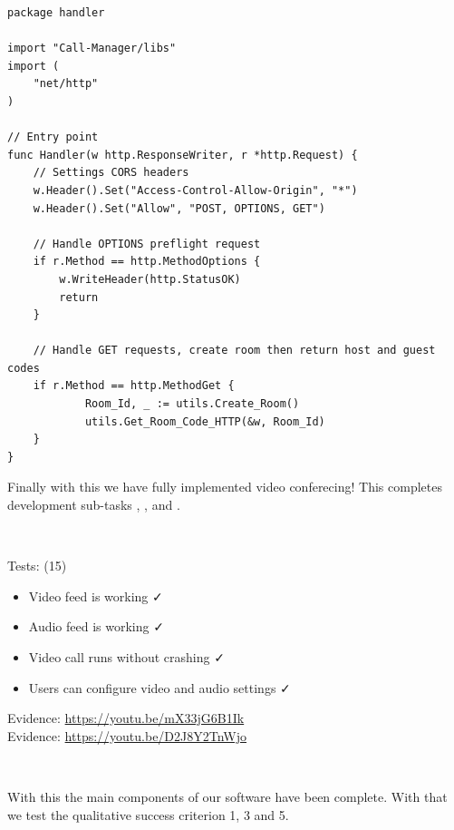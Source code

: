 \begin{verbatim}
package handler

import "Call-Manager/libs"
import (
	"net/http"
)

// Entry point
func Handler(w http.ResponseWriter, r *http.Request) {
	// Settings CORS headers
	w.Header().Set("Access-Control-Allow-Origin", "*")
	w.Header().Set("Allow", "POST, OPTIONS, GET")

	// Handle OPTIONS preflight request
	if r.Method == http.MethodOptions {
		w.WriteHeader(http.StatusOK)
		return
	}

	// Handle GET requests, create room then return host and guest codes
	if r.Method == http.MethodGet {
    		Room_Id, _ := utils.Create_Room()
     		utils.Get_Room_Code_HTTP(&w, Room_Id)
	}
}
\end{verbatim}

Finally with this we have fully implemented video conferecing!
This completes development sub-tasks , ,  and
.

{\color{gray} \hrulefill} \\ \vspace{0.2cm}

{\sffamily Tests: (15)}

\begin{itemize}
  \item Video feed is working \faCheck \\
  \item Audio feed is working \faCheck \\
  \item Video call runs without crashing \faCheck \\
  \item Users can configure video and audio settings \faCheck \\
\end{itemize}

{\sffamily Evidence: } \url{https://youtu.be/mX33jG6B1Ik} \\ \vspace{0.2cm}
{\sffamily Evidence: } \url{https://youtu.be/D2J8Y2TnWjo} \\ \vspace{0.2cm}

{\color{gray} \hrulefill} \\ \vspace{0.2cm}

With this the main components of our software have
been complete. With that we test the qualitative
success criterion 1, 3 and 5. \\ \vspace{0.2cm}

